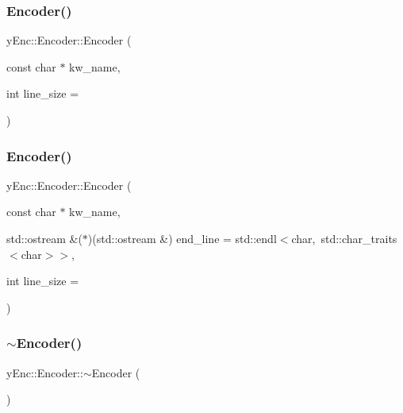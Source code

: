\hypertarget{classy_enc_1_1_encoder_a35fd881c16343781020c36028f832f26}{}\label{classy_enc_1_1_encoder_a35fd881c16343781020c36028f832f26} 
\subsubsection{\texorpdfstring{Encoder()}{Encoder()}\hspace{0.1cm}{\footnotesize\ttfamily [2/3]}}
{\footnotesize\ttfamily y\+Enc\+::\+Encoder\+::\+Encoder (\begin{DoxyParamCaption}\item[{const char $\ast$}]{kw\+\_\+name,  }\item[{int}]{line\+\_\+size = {} }\end{DoxyParamCaption})\hspace{0.3cm}{\ttfamily [inline]}}

\hypertarget{classy_enc_1_1_encoder_a0ef468c9c0e7aa94c7fa03f8317ea924}{}\label{classy_enc_1_1_encoder_a0ef468c9c0e7aa94c7fa03f8317ea924} 
\subsubsection{\texorpdfstring{Encoder()}{Encoder()}\hspace{0.1cm}{\footnotesize\ttfamily [3/3]}}
{\footnotesize\ttfamily y\+Enc\+::\+Encoder\+::\+Encoder (\begin{DoxyParamCaption}\item[{const char $\ast$}]{kw\+\_\+name,  }\item[{std\+::ostream \&($\ast$)(std\+::ostream \&)}]{end\+\_\+line = {\ttfamily std\+:\+:endl$<$char,~std\+:\+:char\+\_\+traits$<$char$>$$>$},  }\item[{int}]{line\+\_\+size = {} }\end{DoxyParamCaption})\hspace{0.3cm}{\ttfamily [inline]}}

\hypertarget{classy_enc_1_1_encoder_a6c23dbd3910d1849e8287f3e83ae66b9}{}\label{classy_enc_1_1_encoder_a6c23dbd3910d1849e8287f3e83ae66b9} 
\subsubsection{\texorpdfstring{$\sim$\+Encoder()}{~Encoder()}}
{\footnotesize\ttfamily y\+Enc\+::\+Encoder\+::$\sim$\+Encoder (\begin{DoxyParamCaption}{ }\end{DoxyParamCaption})\hspace{0.3cm}{\ttfamily [inline]}}



